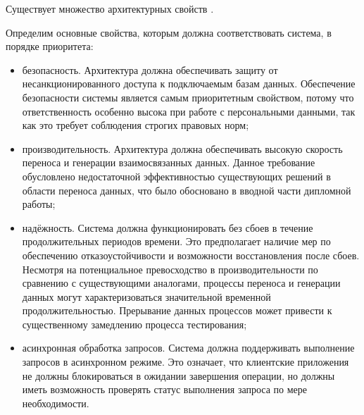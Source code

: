 Существует множество архитектурных свойств \cite{fundamental-arch}.

Определим основные свойства, которым должна соответствовать система, в порядке приоритета:

\begin{itemize}
    \item безопасность. Архитектура должна обеспечивать защиту от несанкционированного доступа к подключаемым базам данных. Обеспечение безопасности системы является самым приоритетным свойством, потому что ответственность особенно высока при работе с персональными данными, так как это требует соблюдения строгих правовых норм;
    \item производительность. Архитектура должна обеспечивать высокую скорость переноса и генерации взаимосвязанных данных. Данное требование обусловлено недостаточной эффективностью существующих решений в области переноса данных, что было обосновано в вводной части дипломной работы;
    \item надёжность. Система должна функционировать без сбоев в течение продолжительных периодов времени. Это предполагает наличие мер по обеспечению отказоустойчивости и возможности восстановления после сбоев. Несмотря на потенциальное превосходство в производительности по сравнению с существующими аналогами, процессы переноса и генерации данных могут характеризоваться значительной временной продолжительностью. Прерывание данных процессов может привести к существенному замедлению процесса тестирования;
    \item асинхронная обработка запросов. Система должна поддерживать выполнение запросов в асинхронном режиме. Это означает, что клиентские приложения не должны блокироваться в ожидании завершения операции, но должны иметь возможность проверять статус выполнения запроса по мере необходимости.
\end{itemize}
